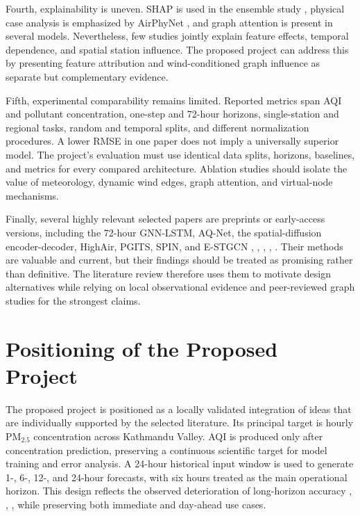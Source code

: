 Fourth, explainability is uneven. SHAP is used in the ensemble study \cite{ref12}, physical case analysis is emphasized by AirPhyNet \cite{ref24}, and graph attention is present in several models. Nevertheless, few studies jointly explain feature effects, temporal dependence, and spatial station influence. The proposed project can address this by presenting feature attribution and wind-conditioned graph influence as separate but complementary evidence.

Fifth, experimental comparability remains limited. Reported metrics span AQI and pollutant concentration, one-step and 72-hour horizons, single-station and regional tasks, random and temporal splits, and different normalization procedures. A lower RMSE in one paper does not imply a universally superior model. The project's evaluation must use identical data splits, horizons, baselines, and metrics for every compared architecture. Ablation studies should isolate the value of meteorology, dynamic wind edges, graph attention, and virtual-node mechanisms.

Finally, several highly relevant selected papers are preprints or early-access versions, including the 72-hour GNN-LSTM, AQ-Net, the spatial-diffusion encoder-decoder, HighAir, PGITS, SPIN, and E-STGCN \cite{ref15}, \cite{ref23}, \cite{ref25}, \cite{ref28}, \cite{ref31,ref32,ref33}. Their methods are valuable and current, but their findings should be treated as promising rather than definitive. The literature review therefore uses them to motivate design alternatives while relying on local observational evidence and peer-reviewed graph studies for the strongest claims.

\section{Positioning of the Proposed Project}

The proposed project is positioned as a locally validated integration of ideas that are individually supported by the selected literature. Its principal target is hourly PM$_{2.5}$ concentration across Kathmandu Valley. AQI is produced only after concentration prediction, preserving a continuous scientific target for model training and error analysis. A 24-hour historical input window is used to generate 1-, 6-, 12-, and 24-hour forecasts, with six hours treated as the main operational horizon. This design reflects the observed deterioration of long-horizon accuracy \cite{ref15}, \cite{ref18}, \cite{ref20}, \cite{ref24} while preserving both immediate and day-ahead use cases.

